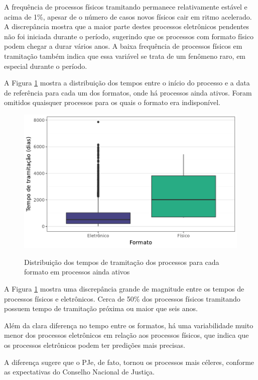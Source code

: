 A frequência de processos físicos tramitando permanece relativamente estável e acima de 1\%, apesar de o número de casos novos físicos cair em ritmo acelerado. A discrepância mostra que a maior parte destes processos eletrônicos pendentes não foi iniciada durante o período, sugerindo que os processos com formato físico podem chegar a durar vários anos. A baixa frequência de processos físicos em tramitação também indica que essa variável se trata de um fenômeno raro, em especial durante o período.

A Figura \ref{fig:formato_tempo} mostra a distribuição dos tempos entre o início do processo e a data de referência para cada um dos formatos, onde há processos ainda ativos. Foram omitidos quaisquer processos para os quais o formato era indisponível.

\begin{figure}[H]
    \centering
    \caption{Distribuição dos tempos de tramitação dos processos para cada formato em processos ainda ativos}
    \includegraphics[scale=.93]{imagens/formato_tempo.pdf}
    \label{fig:formato_tempo}
\end{figure}

A Figura \ref{fig:formato_tempo} mostra uma discrepância grande de magnitude entre os tempos de processos físicos e eletrônicos. Cerca de 50\% dos processos físicos tramitando possuem tempo de tramitação próxima ou maior que seis anos.

Além da clara diferença no tempo entre os formatos, há uma variabilidade muito menor dos processos eletrônicos em relação aos processos físicos, que indica que os processos eletrônicos podem ter predições mais precisas.

A diferença sugere que o PJe, de fato, tornou os processos mais céleres, conforme as expectativas do Conselho Nacional de Justiça.


